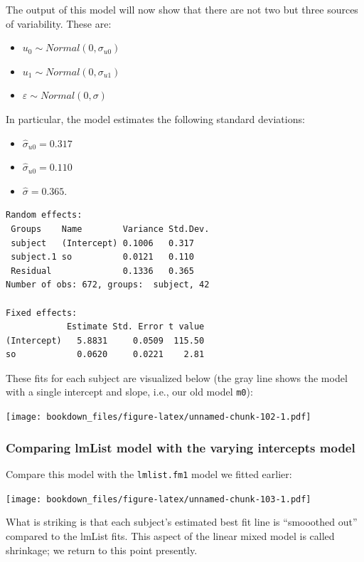 \documentclass[12pt,]{krantz}
\providecommand{\tightlist}{%
  \setlength{\itemsep}{0pt}\setlength{\parskip}{0pt}}
\begin{document}
The output of this model will now show that there are not two but three sources of variability. These are:

\begin{itemize}
\tightlist
\item
  \(u_0 \sim Normal(0,\sigma_{u0})\)
\item
  \(u_1 \sim Normal(0,\sigma_{u1})\)
\item
  \(\varepsilon \sim Normal(0,\sigma)\)
\end{itemize}

In particular, the model estimates the following standard deviations:

\begin{itemize}
\tightlist
\item
  \(\hat\sigma_{u0}=0.317\)
\item
  \(\hat\sigma_{u0}=0.110\)
\item
  \(\hat\sigma = 0.365\).
\end{itemize}

\begin{verbatim}
Random effects:
 Groups    Name        Variance Std.Dev.
 subject   (Intercept) 0.1006   0.317   
 subject.1 so          0.0121   0.110   
 Residual              0.1336   0.365   
Number of obs: 672, groups:  subject, 42

Fixed effects:
            Estimate Std. Error t value
(Intercept)   5.8831     0.0509  115.50
so            0.0620     0.0221    2.81
\end{verbatim}

These fits for each subject are visualized below (the gray line shows the model with a single intercept and slope, i.e., our old model \texttt{m0}):

\texttt{[image: bookdown\_files/figure-latex/unnamed-chunk-102-1.pdf]}

\hypertarget{comparing-lmlist-model-with-the-varying-intercepts-model}{%
\subsubsection{Comparing lmList model with the varying intercepts model}\label{comparing-lmlist-model-with-the-varying-intercepts-model}}

Compare this model with the \texttt{lmlist.fm1} model we fitted earlier:

\texttt{[image: bookdown\_files/figure-latex/unnamed-chunk-103-1.pdf]}

What is striking is that each subject's estimated best fit line is ``smooothed out'' compared to the lmList fits. This aspect of the linear mixed model is called shrinkage; we return to this point presently.
\end{document}

